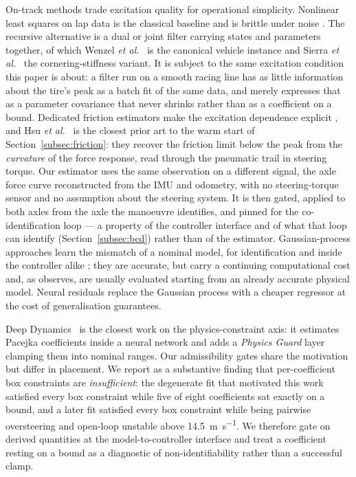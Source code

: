 On-track methods trade excitation quality for operational simplicity.
Nonlinear least squares on lap data is the classical baseline and is brittle
under noise \cite{ontrack2025}. The recursive alternative is a dual or joint
filter carrying states and parameters together, of which Wenzel \emph{et
al.}~\cite{wenzel2006dekf} is the canonical vehicle instance and Sierra
\emph{et al.}~\cite{sierra2006cornering} the cornering-stiffness variant. It is
subject to the same excitation condition this paper is about: a filter run on a
smooth racing line has as little information about the tire's peak as a batch
fit of the same data, and merely expresses that as a parameter covariance that
never shrinks rather than as a coefficient on a bound. Dedicated friction
estimators make the excitation dependence explicit
\cite{rajamani2012wheelfriction,ahn2013friction,acosta2017friction,khaleghian2017survey},
and Hsu \emph{et al.}~\cite{hsu2010trail} is the closest prior art to the warm
start of Section~\ref{subsec:friction}: they recover the friction limit below
the peak from the \emph{curvature} of the force response, read through the
pneumatic trail in steering torque. Our estimator uses the same observation on
a different signal, the axle force curve reconstructed from the IMU and
odometry, with no steering-torque sensor and no assumption about the steering
system. It is then gated, applied to both axles from the axle the manoeuvre
identifies, and pinned for the co-identification loop --- a property of the
controller interface and of what that loop can identify
(Section~\ref{subsec:bcd}) rather than of the estimator. Gaussian-process
approaches learn the mismatch of a nominal model, for identification and inside
the controller alike \cite{hewing2018cautious,hewing2020cautious,kabzan2019lbmpc};
they are accurate, but carry a continuing computational cost and, as
\cite{ontrack2025} observes, are usually evaluated starting from an already
accurate physical model. Neural residuals replace the Gaussian process with a
cheaper regressor at the cost of generalisation guarantees.

Deep Dynamics~\cite{deepdynamics2024} is the closest work on the
physics-constraint axis: it estimates Pacejka coefficients inside a neural
network and adds a \emph{Physics Guard} layer clamping them into nominal
ranges. Our admissibility gates share the motivation but differ in placement.
We report as a substantive finding that per-coefficient box constraints are
\emph{insufficient}: the degenerate fit that motivated this work satisfied
every box constraint while five of eight coefficients sat exactly on a bound,
and a later fit satisfied every box constraint while being pairwise
oversteering and open-loop unstable above \SI{14.5}{\meter\per\second}. We
therefore gate on derived quantities at the model-to-controller interface and
treat a coefficient resting on a bound as a diagnostic of non-identifiability
rather than a successful clamp.

